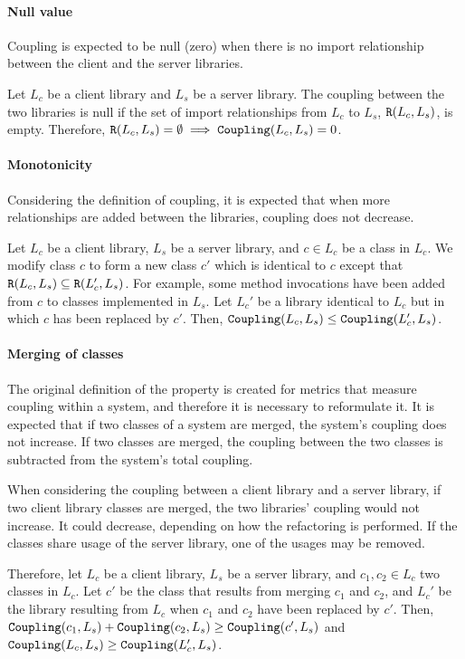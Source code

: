 \paragraph{Null value}
Coupling is expected to be null (zero) when there is no import relationship between the client and the server libraries.

Let $L_c$ be a client library and $L_s$ be a server library. The coupling between the two libraries is null if the set of import relationships from $L_c$ to $L_s$, $\verb|R|(L_c, L_s)$, is empty. Therefore, $\verb|R|(L_c, L_s) = \emptyset \implies \verb|Coupling|(L_c, L_s) = 0$.

\paragraph{Monotonicity}
Considering the definition of coupling, it is expected that when more relationships are added between the libraries, coupling does not decrease.

Let $L_c$ be a client library, $L_s$ be a server library, and $c \in L_c$ be a class in $L_c$. We modify class $c$ to form a new class $c'$ which is identical to $c$ except that $\verb|R|(L_c, L_s) \subseteq \verb|R|(L_c', L_s)$. For example, some method invocations have been added from $c$ to classes implemented in $L_s$. Let $L_c'$ be a library identical to $L_c$ but in which $c$ has been replaced by $c'$. Then, $\verb|Coupling|(L_c, L_s) \le \verb|Coupling|(L_c', L_s)$.

\paragraph{Merging of classes}
The original definition of the property is created for metrics that measure coupling within a system, and therefore it is necessary to reformulate it. It is expected that if two classes of a system are merged, the system's coupling does not increase. If two classes are merged, the coupling between the two classes is subtracted from the system's total coupling.

When considering the coupling between a client library and a server library, if two client library classes are merged, the two libraries' coupling would not increase. It could decrease, depending on how the refactoring is performed. If the classes share usage of the server library, one of the usages may be removed.

Therefore, let $L_c$ be a client library, $L_s$ be a server library, and $c_1, c_2 \in L_c$ two classes in $L_c$. Let $c'$ be the class that results from merging  $c_1$ and $c_2$, and $L_c'$ be the library resulting from $L_c$ when $c_1$ and $c_2$ have been replaced by $c'$. Then, $\verb|Coupling|(c_1, L_s) + \verb|Coupling|(c_2, L_s) \ge \verb|Coupling|(c', L_s)$ and $\verb|Coupling|(L_c, L_s) \ge \verb|Coupling|(L_c', L_s)$.

